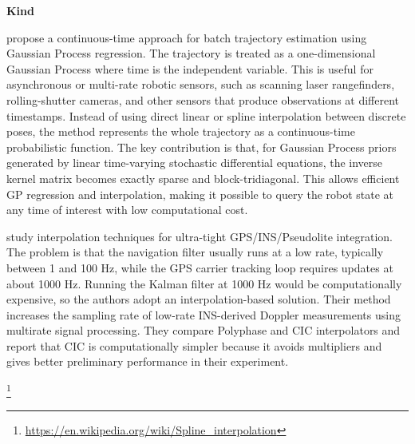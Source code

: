 \documentclass{book}
\providecommand{\ProjectDeepHeading}[2]{%
    \par\medskip\noindent\textbf{#2}\par\smallskip
}
\providecommand{\seeherefooter}[1]{\footnote{\url{#1}}}
\begin{document}
\ProjectDeepHeading{6}{Kind}


\cite{barfoot-2014-batch-continuous-time-trajectory-estimation-as-exactly-sparse-gaussian-process-regression} propose a continuous-time approach for batch trajectory estimation using Gaussian Process regression. The trajectory is treated as a one-dimensional Gaussian Process where time is the independent variable. This is useful for asynchronous or multi-rate robotic sensors, such as scanning laser rangefinders, rolling-shutter cameras, and other sensors that produce observations at different timestamps. Instead of using direct linear or spline interpolation between discrete poses, the method represents the whole trajectory as a continuous-time probabilistic function. The key contribution is that, for Gaussian Process priors generated by linear time-varying stochastic differential equations, the inverse kernel matrix becomes exactly sparse and block-tridiagonal. This allows efficient GP regression and interpolation, making it possible to query the robot state at any time of interest with low computational cost.


\cite{babu-2005-comparative-study-of-interpolation-techniques-for-ultra-tight-integration-of-gps-ins-pl-sensors} study interpolation techniques for ultra-tight GPS/INS/Pseudolite integration. The problem is that the navigation filter usually runs at a low rate, typically between 1 and 100 Hz, while the GPS carrier tracking loop requires updates at about 1000 Hz. Running the Kalman filter at 1000 Hz would be computationally expensive, so the authors adopt an interpolation-based solution. Their method increases the sampling rate of low-rate INS-derived Doppler measurements using multirate signal processing. They compare Polyphase and CIC interpolators and report that CIC is computationally simpler because it avoids multipliers and gives better preliminary performance in their experiment.


\seeherefooter{https://en.wikipedia.org/wiki/Spline_interpolation}
    
\end{document}
